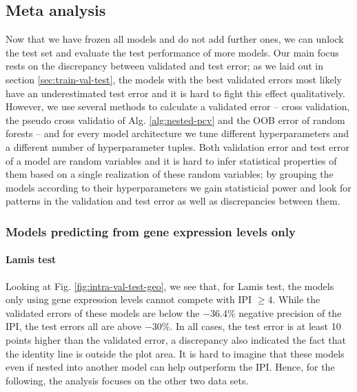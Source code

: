 \subsection{Meta analysis}

Now that we have frozen all models and do not add further ones, we can unlock the test set and 
evaluate the test performance of more models. Our main focus rests on the discrepancy between 
validated and test error; as we laid out in section \ref{sec:train-val-test}, the models with the 
best validated errors most likely have an underestimated test error and it is hard to fight this 
effect qualitatively. However, we use several methods to calculate a validated error -- cross 
validation, the pseudo cross validatio of Alg. \ref{alg:nested-pcv} and the OOB error of random 
forests -- and for every model architecture we tune different hyperparameters and a different 
number of hyperparameter tuples. Both validation error and test error of a model are random 
variables and it is hard to infer statistical properties of them based on a single realization of 
these random variables; by grouping the models according to their hyperparameters we gain 
statisticial power and look for patterns in the validation and test error as well as 
discrepancies between them.

\subsubsection{Models predicting from gene expression levels only}



\paragraph{Lamis test}
Looking at Fig. \ref{fig:intra-val-test-geo}, we see that, for Lamis test, the models only using 
gene expression levels cannot compete with IPI $\geq 4$. While the validated errors of these models are 
below the \num{-36.4}\% negative precision of the IPI, the test errors all are above \num{-30}\%. 
In all cases, the test error is at least 10 points higher than the validated error, a discrepancy 
also indicated the fact that the identity line is outside the plot area. It is hard to imagine that 
these models even if nested into another model can help outperform the IPI. Hence, for the 
following, the analysis focuses on the other two data sets.

